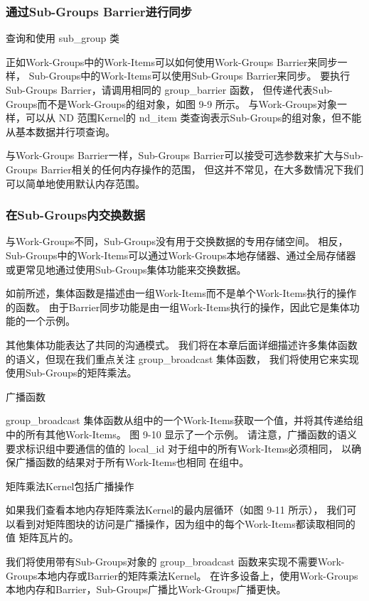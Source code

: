 \subsubsection{通过Sub-Groups Barrier进行同步}
{\color{red} 查询和使用 sub\_group 类}

正如Work-Groups中的Work-Items可以如何使用Work-Groups Barrier来同步一样，
Sub-Groups中的Work-Items可以使用Sub-Groups Barrier来同步。 
要执行Sub-Groups Barrier，请调用相同的 group\_barrier 函数，
但传递代表Sub-Groups而不是Work-Groups的组对象，如图 9-9 所示。 
与Work-Groups对象一样，可以从 ND 范围Kernel的 nd\_item 类查询表示Sub-Groups的组对象，但不能从基本数据并行项查询。

与Work-Groups Barrier一样，Sub-Groups Barrier可以接受可选参数来扩大与Sub-Groups Barrier相关的任何内存操作的范围，
但这并不常见，在大多数情况下我们可以简单地使用默认内存范围。

\subsubsection{在Sub-Groups内交换数据}
与Work-Groups不同，Sub-Groups没有用于交换数据的专用存储空间。 
相反，Sub-Groups中的Work-Items可以通过Work-Groups本地存储器、通过全局存储器或更常见地通过使用Sub-Groups集体功能来交换数据。

如前所述，集体函数是描述由一组Work-Items而不是单个Work-Items执行的操作的函数。 
由于Barrier同步功能是由一组Work-Items执行的操作，因此它是集体功能的一个示例。

其他集体功能表达了共同的沟通模式。 
我们将在本章后面详细描述许多集体函数的语义，但现在我们重点关注 group\_broadcast 集体函数，
我们将使用它来实现使用Sub-Groups的矩阵乘法。

{\color{red} 广播函数}

group\_broadcast 集体函数从组中的一个Work-Items获取一个值，并将其传递给组中的所有其他Work-Items。 
图 9-10 显示了一个示例。 
请注意，广播函数的语义要求标识组中要通信的值的 local\_id 对于组中的所有Work-Items必须相同，
以确保广播函数的结果对于所有Work-Items也相同 在组中。

{\color{red} 矩阵乘法Kernel包括广播操作}

如果我们查看本地内存矩阵乘法Kernel的最内层循环（如图 9-11 所示），
我们可以看到对矩阵图块的访问是广播操作，因为组中的每个Work-Items都读取相同的值 矩阵瓦片的。

我们将使用带有Sub-Groups对象的 group\_broadcast 函数来实现不需要Work-Groups本地内存或Barrier的矩阵乘法Kernel。 
在许多设备上，使用Work-Groups本地内存和Barrier，Sub-Groups广播比Work-Groups广播更快。

